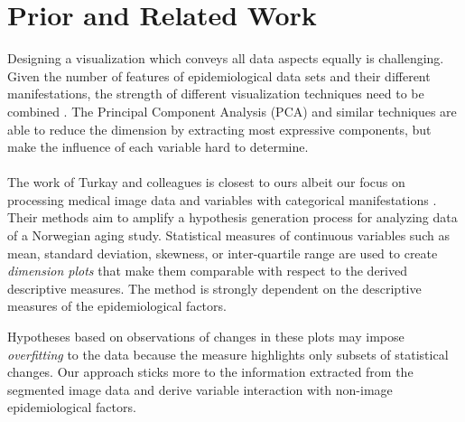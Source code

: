 \documentclass[journal]{style/vgtc} 			          %
\begin{document}
\section{Prior and Related Work}
Designing a visualization which conveys all data aspects equally is challenging.
%
Given the number of features of epidemiological data sets and their different manifestations, the strength of different visualization techniques need to be combined \cite{Buja91, Konyha2009}.
%
The Principal Component Analysis (PCA) and similar techniques are able to reduce the dimension by extracting most expressive components, but make the influence of each variable hard to determine.
\\\\
The work of Turkay and colleagues is closest to ours albeit our focus on processing medical image data and variables with categorical manifestations \cite{Turkay2013}.
%
Their methods aim to amplify a hypothesis generation process for analyzing data of a Norwegian aging study.
%
Statistical measures of continuous variables such as mean, standard deviation, skewness, or inter-quartile range are used to create \emph{dimension plots} that make them comparable with respect to the derived descriptive measures.
%
%
%
%
%
The method is strongly dependent on the descriptive measures of the epidemiological factors.

Hypotheses based on observations of changes in these plots may impose \emph{overfitting} to the data because the measure highlights only subsets of statistical changes.
%
Our approach sticks more to the information extracted from the segmented image data and derive variable interaction with non-image epidemiological factors.
\end{document}

